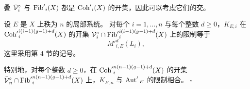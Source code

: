 叠 $\bar{\mathcal{V}}{}^\circ_i$ 与 ${\operatorname{Fib}'}_i(X)$ 都是 ${\operatorname{Coh}'}_i(X)$ 的开集，因此可以考虑它们的交。

\begin{lemma}
设 $E$ 是 $X$ 上秩为 $n$ 的局部系统。
对每个 $i=1,\dots,n$ 与每个整数 $d\ge 0$，$K_{E,i}$ 在
${\operatorname{Coh}'}^{i(i-1)(g-1)+d}_i(X)$ 的开集
$\bar{\mathcal{V}}{}^\circ_i\cap{\operatorname{Fib}'}^{i(i-1)(g-1)+d}_i(X)$ 上的限制等于
\[
  M'^{d}_{i,E}(L_i),
\]
这里采用第 4 节的记号。

特别地，对每个整数 $d\ge 0$，在 ${\operatorname{Coh}'}^{n(n-1)(g-1)+d}_i(X)$ 的开集
$\bar{\mathcal{V}}{}^\circ_n\cap{\operatorname{Fib}'}^{n(n-1)(g-1)+d}_i(X)$ 上，$K_{E,n}$ 与 $\operatorname{Aut}'{}_E$ 的限制相合。%
\hfill$\square$
\end{lemma}
